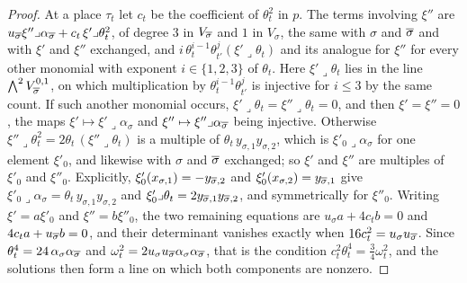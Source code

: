 \begin{proof}
At a place $\tau_{t}$ let $c_{t}$ be the coefficient of $\theta_{t}^{2}$ in $p$.
The terms involving $\xi''$ are $u_{\overline{\sigma}}\xi''\lrcorner
\alpha_{\overline{\sigma}}+c_{t}\,\xi'\lrcorner\theta_{t}^{2}$, of degree $3$ in
$V_{\overline{\sigma}}$ and $1$ in $V_{\sigma}$, the same with $\sigma$ and
$\overline{\sigma}$ and with $\xi'$ and $\xi''$ exchanged, and
$i\,\theta_{t}^{i-1}\theta_{t'}^{j}(\xi'\lrcorner\theta_{t})$ and its analogue
for $\xi''$ for every other monomial with exponent $i\in\{1,2,3\}$ of
$\theta_{t}$. Here $\xi'\lrcorner\theta_{t}$ lies in the line
$\bigwedge^{2}V_{\overline{\sigma}}^{0,1}$, on which multiplication by
$\theta_{t}^{i-1}\theta_{t'}^{j}$ is injective for $i\le3$ by the same count. If
such another monomial occurs, $\xi'\lrcorner\theta_{t}=\xi''\lrcorner
\theta_{t}=0$, and then $\xi'=\xi''=0$, the maps $\xi'\mapsto
\xi'\lrcorner\alpha_{\sigma}$ and $\xi''\mapsto\xi''\lrcorner\alpha_{\overline{\sigma}}$
being injective. Otherwise $\xi''\lrcorner\theta_{t}^{2}=2\theta_{t}\,
(\xi''\lrcorner\theta_{t})$ is a multiple of $\theta_{t}\,y_{\sigma,1}
y_{\sigma,2}$, which is $\xi'_{0}\lrcorner\alpha_{\sigma}$ for one element
$\xi'_{0}$, and likewise with $\sigma$ and $\overline{\sigma}$ exchanged; so $\xi'$
and $\xi''$ are multiples of $\xi'_{0}$ and $\xi''_{0}$. Explicitly,
$\xi'_{0}(x_{\sigma,1})=-y_{\overline{\sigma},2}$ and
$\xi'_{0}(x_{\sigma,2})=y_{\overline{\sigma},1}$ give
$\xi'_{0}\lrcorner\alpha_{\sigma}=\theta_{t}\,y_{\sigma,1}y_{\sigma,2}$ and
$\xi'_{0}\lrcorner\theta_{t}=2y_{\overline{\sigma},1}y_{\overline{\sigma},2}$, and
symmetrically for $\xi''_{0}$. Writing $\xi'=a\xi'_{0}$ and
$\xi''=b\xi''_{0}$, the two remaining equations are
$u_{\sigma}a+4c_{t}b=0$ and $4c_{t}a+u_{\overline{\sigma}}b=0$, and their
determinant vanishes exactly when $16c_{t}^{2}=u_{\sigma}u_{\overline{\sigma}}$. Since $\theta_{t}^{4}=24\,
\alpha_{\sigma}\alpha_{\overline{\sigma}}$ and $\omega_{t}^{2}=2u_{\sigma}
u_{\overline{\sigma}}\alpha_{\sigma}\alpha_{\overline{\sigma}}$, that is the condition
$c_{t}^{2}\theta_{t}^{4}=\frac34\omega_{t}^{2}$, and the solutions then form a
line on which both components are nonzero.


\end{proof}
